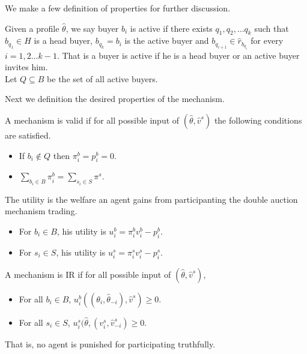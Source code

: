 We make a few definition of properties for further discussion.

\begin{definition}
	Given a profile $\hat\theta$, we say buyer $b_i$ is active
	if there exists $q_1,q_2,\ldots q_k$ such that
	$b_{q_1}\in H$ is a head buyer, $b_{q_k}=b_i$ is the active buyer and
	$b_{q_{i+1}} \in \hat r_{b_{q_i}}$ for every $i=1,2\ldots k-1$.
	That is a buyer is active if he is a head buyer or an active buyer invites him.\\
	Let $Q\subseteq B$ be the set of all active buyers.
\end{definition}

Next we definition the desired properties of the mechanism.

\begin{definition}[valid]
	A mechanism is valid if for all possible input of $(\hat\theta,\hat v^s)$ the following conditions are satisfied.
	\begin{itemize}
		\item If $b_i\not\in Q$ then $\pi^b_i=p^b_i=0$.
		\item $\sum_{b_i\in B} \pi^b_i = \sum_{s_i\in S} \pi^s$.
	\end{itemize}
\end{definition} 

\begin{definition}[utility]
	The utility is the welfare an agent gains from participanting the double auction mechanism trading.
	\begin{itemize}
		\item For $b_i\in B$, his utility is $u^b_i = \pi^b_i v^b_i-p^b_i$.
		\item For $s_i\in S$, his utility is $u^s_i = \pi^s_i v^s_i-p^s_i$.
	\end{itemize}
\end{definition}

\begin{definition}
	A mechanism is IR if for all possible input of $(\hat\theta,\hat v^s)$,
	\begin{itemize}
		\item For all $b_i\in B$, $u^b_i((\theta_i,\hat\theta_{-i}),\hat v^s)\geq 0$.
		\item For all $s_i\in S$, $u^s_i(\hat\theta,(v^s_i, \hat v^s_{-i})\geq 0$.
	\end{itemize}
	That is, no agent is punished for participating truthfully.
\end{definition}

